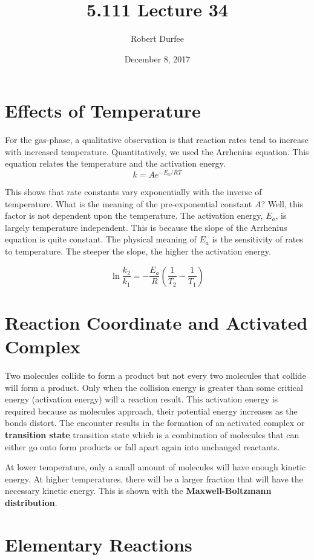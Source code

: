 \documentclass{article}
\title{ 5.111 Lecture 34 }
\author{ Robert Durfee }
\date{ December 8, 2017 }
\begin{document}
\maketitle

\section{ Effects of Temperature }

For the gas-phase, a qualitative observation is that reaction rates tend to
increase with increased temperature. Quantitatively, we used the Arrhenius
equation. This equation relates the temperature and the activation energy.
$$ k = Ae^{- E_{a} / RT } $$

This shows that rate constants vary exponentially with the inverse of
temperature. What is the meaning of the pre-exponential constant $A$? Well, this
factor is not dependent upon the temperature. The activation energy, $E_{a}$, is
largely temperature independent. This is because the slope of the Arrhenius
equation is quite constant. The physical meaning of $E_{a}$ is the sensitivity
of rates to temperature. The steeper the slope, the higher the activation
energy. 

$$ \ln \frac{ k_{2} }{ k_{1} } = -\frac{ E_{a} }{ R } \left( \frac{ 1 }{ T_{2} }
- \frac{ 1 }{ T_{1} }\right) $$

\section{ Reaction Coordinate and Activated Complex }

Two molecules collide to form a product but not every two molecules that collide
will form a product. Only when the collision energy is greater than some
critical energy (activation energy) will a reaction result. This activation
energy is required because as molecules approach, their potential energy
increases as the bonds distort. The encounter results in the formation of an
activated complex or \textbf{transition state} transition state which is a
combination of molecules that can either go onto form products or fall apart
again into unchanged reactants. 

At lower temperature, only a small amount of molecules will have enough kinetic
energy. At higher temperatures, there will be a larger fraction that will have
the necessary kinetic energy. This is shown with the \textbf{Maxwell-Boltzmann
distribution}. 

\section{ Elementary Reactions }
\end{document}
